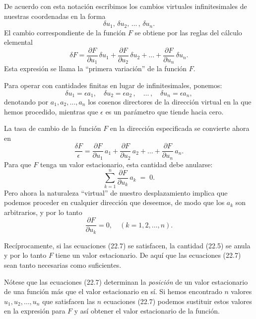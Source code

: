 \documentclass[12pt,a4paper]{book}
\begin{document}
De acuerdo con esta notación escribimos los cambios virtuales infinitesimales de nuestras coordenadas en la forma
\begin{equation}
\delta u_1, \, \delta u_2, \, \ldots \, , \, \delta u_n. \tag{22.2}
\end{equation}
El cambio correspondiente de la función $F$ se obtiene por las reglas del cálculo elemental
\begin{equation}
\delta F = \frac{\partial F}{\partial u_1} \, \delta u_1 + \frac{\partial F}{\partial u_2} \, \delta u_2 + \ldots + \frac{\partial F}{\partial u_n} \, \delta u_n. \tag{22.3}
\end{equation}
Esta expresión se llama la ``primera variación'' de la función $F$.

Para operar con cantidades finitas en lugar de infinitesimales, ponemos:
\begin{equation}
\delta u_1 = \epsilon a_1, \quad \delta u_2 = \epsilon a_2 \, , \quad \ldots \, , \quad \delta u_n = \epsilon a_n, \tag{22.4}
\end{equation}
denotando por $a_1, a_2, \ldots, a_n$ los cosenos directores de la dirección virtual en la que hemos procedido, mientras que $\epsilon$ es un parámetro que tiende hacia cero.

La tasa de cambio de la función $F$ en la dirección especificada se convierte ahora en
\begin{equation}
\frac{\delta F}{\epsilon} = \frac{\partial F}{\partial u_1} \, a_1 + \frac{\partial F}{\partial u_2} \, a_2 + \ldots + \frac{\partial F}{\partial u_n} \, a_n. \tag{22.5}
\end{equation}
Para que $F$ tenga un valor estacionario, esta cantidad debe anularse:
\begin{equation}
\sum_{k=1}^{n} \frac{\partial F}{\partial u_k} \, a_k \; = \; 0. \tag{22.6}
\end{equation}
Pero ahora la naturaleza ``virtual'' de nuestro desplazamiento implica que podemos proceder en cualquier dirección que deseemos, de modo que los $a_k$ son arbitrarios, y por lo tanto
\begin{equation}
\frac{\partial F}{\partial u_k} = 0, \quad (k = 1, 2, \ldots, n). \tag{22.7}
\end{equation}

Recíprocamente, si las ecuaciones (22.7) se satisfacen, la cantidad (22.5) se anula y por lo tanto $F$ tiene un valor estacionario. De aquí que las ecuaciones (22.7) sean tanto necesarias como suficientes.

Nótese que las ecuaciones (22.7) determinan la \textit{posición} de un valor estacionario de una función más que el valor estacionario en sí. Si hemos encontrado $n$ valores $u_1, u_2, \ldots, u_n$ que satisfacen las $n$ ecuaciones (22.7) podemos sustituir estos valores en la expresión para $F$ y así obtener el valor estacionario de la función.
\end{document}
